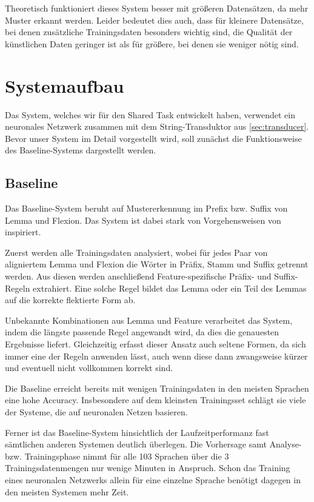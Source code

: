 \documentclass[11pt,a4paper]{article}
\begin{document}
Theoretisch funktioniert dieses System besser mit größeren Datensätzen, da mehr Muster erkannt werden. Leider bedeutet dies auch, dass für kleinere Datensätze, bei denen zusätzliche Trainingsdaten besonders wichtig sind, die Qualität der künstlichen Daten geringer ist als für größere, bei denen sie weniger nötig sind.

\section{Systemaufbau}
\label{sec:architecture}
Das System, welches wir für den Shared Task entwickelt haben, verwendet ein neuronales Netzwerk zusammen mit dem String-Transduktor aus \autoref{sec:transducer}. Bevor unser System im Detail vorgestellt wird, soll zunächst die Funktionsweise des Baseline-Systems dargestellt werden.

\subsection{Baseline}
\label{sec:baseline}
Das Baseline-System beruht auf Mustererkennung im Prefix bzw. Suffix von Lemma und Flexion. Das System ist dabei stark von Vorgehensweisen von \citet{baseline:Ling2016} inspiriert.

Zuerst werden alle Trainingsdaten analysiert, wobei für jedes Paar von aligniertem Lemma und Flexion die Wörter in Präfix, Stamm und Suffix getrennt werden. Aus diesen werden anschließend Feature-spezifische Präfix- und Suffix-Regeln extrahiert. Eine solche Regel bildet das Lemma oder ein Teil des Lemmas auf die korrekte flektierte Form ab.

Unbekannte Kombinationen aus Lemma und Feature verarbeitet das System, indem die längste passende Regel angewandt wird, da dies die genauesten Ergebnisse liefert. Gleichzeitig erfasst dieser Ansatz auch seltene Formen, da sich immer eine der Regeln anwenden lässt, auch wenn diese dann zwangsweise kürzer und eventuell nicht vollkommen korrekt sind.

Die Baseline erreicht bereits mit wenigen Trainingsdaten in den meisten Sprachen eine hohe Accuracy. Insbesondere auf dem kleinsten Trainingsset schlägt sie viele der Systeme, die auf neuronalen Netzen basieren.

Ferner ist das Baseline-System hinsichtlich der Laufzeitperformanz fast sämtlichen anderen Systemen deutlich überlegen. Die Vorhersage samt Analyse- bzw. Trainingsphase nimmt für alle 103 Sprachen über die 3 Trainingsdatenmengen nur wenige Minuten in Anspruch. Schon das Training eines neuronalen Netzwerks allein für eine einzelne Sprache benötigt dagegen in den meisten Systemen mehr Zeit.
\end{document}
